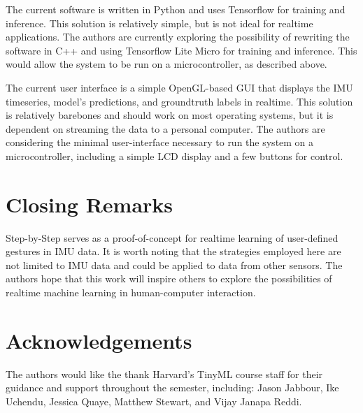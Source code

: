 \documentclass{article}
\begin{document}
The current software is written in Python and uses Tensorflow for training and inference. This solution is relatively simple, but is not ideal for realtime applications. The authors are currently exploring the possibility of rewriting the software in C++ and using Tensorflow Lite Micro for training and inference. This would allow the system to be run on a microcontroller, as described above.

The current user interface is a simple OpenGL-based GUI that displays the IMU timeseries, model's predictions, and groundtruth labels in realtime. This solution is relatively barebones and should work on most operating systems, but it is dependent on streaming the data to a personal computer. The authors are considering the minimal user-interface necessary to run the system on a microcontroller, including a simple LCD display and a few buttons for control.


\section{Closing Remarks}
Step-by-Step serves as a proof-of-concept for realtime learning of user-defined gestures in IMU data. It is worth noting that the strategies employed here are not limited to IMU data and could be applied to data from other sensors. The authors hope that this work will inspire others to explore the possibilities of realtime machine learning in human-computer interaction.

\section{Acknowledgements}
The authors would like the thank Harvard's TinyML course staff for their guidance and support throughout the semester, including: Jason Jabbour, Ike Uchendu, Jessica Quaye, Matthew Stewart, and Vijay Janapa Reddi.

% 
% 
\end{document}
